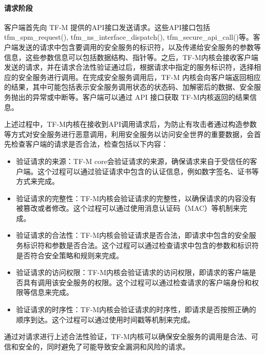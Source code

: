 \documentclass[12pt,a4paper]{ctexart}
\begin{document}
\paragraph{请求阶段}
\par 客户端首先向 TF-M 提供的API接口发送请求。这些API接口包括tfm\_spm\_request(), tfm\_ns\_interface\_dispatch(), tfm\_secure\_api\_call()等。客户端发送的请求中包含要调用的安全服务的标识符，以及传递给安全服务的参数等信息，这些参数信息可以包括数据结构、指针等。之后，TF-M内核会接收客户端发送的请求，并在请求合法性验证通过后，根据请求中指定的服务标识符，选择相应的安全服务进行调用。在完成安全服务调用后，TF-M 内核会向客户端返回相应的结果，其中可能包括表示安全服务调用状态的状态码、加解密后的数据、安全服务抛出的异常或中断等。客户端可以通过 API 接口获取 TF-M内核返回的结果信息。
\par 上述过程中，TF-M内核在接收到API调用请求后，为防止有攻击者通过构造参数等方式对安全服务进行恶意调用，利用安全服务以访问安全世界的重要数据，会首先检查客户端的请求是否合法，检查包括以下内容：
\begin{itemize}
    \item 验证请求的来源：TF-M core会验证请求的来源，确保请求来自于受信任的客户端。这个过程可以通过验证请求中包含的认证信息，例如数字签名、证书等方式来完成。
    \item 验证请求的完整性：TF-M内核会验证请求的完整性，以确保请求的内容没有被篡改或者修改。这个过程可以通过使用消息认证码（MAC）等机制来完成。
    \item  验证请求的合法性：TF-M内核会验证请求是否合法，即请求中包含的安全服务标识符和参数是否合法。这个过程可以通过检查请求中包含的参数和标识符是否符合安全策略和规则来完成。
    \item  验证请求的访问权限：TF-M内核会验证请求的访问权限，即请求的客户端是否具有调用该安全服务的权限。这个过程可以通过检查请求的客户端身份和权限等信息来完成。
    \item  验证请求的时序性：TF-M内核会验证请求的时序性，即请求是否按照正确的顺序到达。这个过程可以通过使用时间戳等机制来完成。
\end{itemize}
\par 通过对请求进行上述合法性验证，TF-M内核可以确保安全服务的调用是合法、可信和安全的，同时避免了可能导致安全漏洞和风险的请求。
\end{document}
